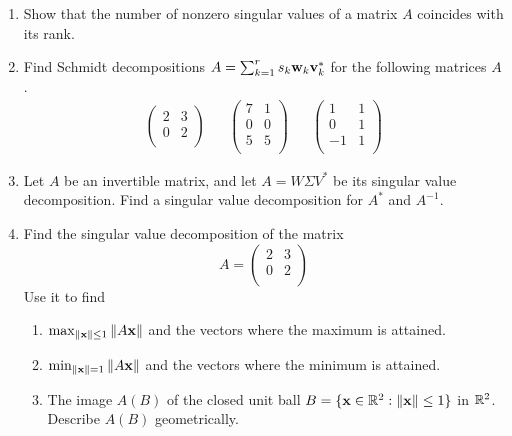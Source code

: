 \documentclass[../psets.tex]{subfiles}
\begin{document}
\begin{enumerate}[label={\textbf{3.\arabic*.}}]
    \item Show that the number of nonzero singular values of a matrix $A$ coincides with its rank.
    \item Find Schmidt decompositions $A=\sum_{k=1}^rs_k\mathbf{w}_k\mathbf{v}_k^*$ for the following matrices $A$.
    \begin{align*}
        \begin{pmatrix}
            2 & 3\\
            0 & 2\\
        \end{pmatrix}&&
        \begin{pmatrix}
            7 & 1\\
            0 & 0\\
            5 & 5\\
        \end{pmatrix}&&
        \begin{pmatrix}
            1 & 1\\
            0 & 1\\
            -1 & 1\\
        \end{pmatrix}
    \end{align*}
    \item Let $A$ be an invertible matrix, and let $A=W\Sigma V^*$ be its singular value decomposition. Find a singular value decomposition for $A^*$ and $A^{-1}$.
    \item Find the singular value decomposition of the matrix
    \begin{equation*}
        A =
        \begin{pmatrix}
            2 & 3\\
            0 & 2\\
        \end{pmatrix}
    \end{equation*}
    Use it to find
    \begin{enumerate}
        \item $\max_{\norm{\mathbf{x}}\leq 1}\norm{A\mathbf{x}}$ and the vectors where the maximum is attained.
        \item $\min_{\norm{\mathbf{x}}=1}\norm{A\mathbf{x}}$ and the vectors where the minimum is attained.
        \item The image $A(B)$ of the closed unit ball $B=\{\mathbf{x}\in\mathbb{R}^2:\norm{\mathbf{x}}\leq 1\}$ in $\mathbb{R}^2$. Describe $A(B)$ geometrically.
    \end{enumerate}

\end{enumerate}
\end{document}
